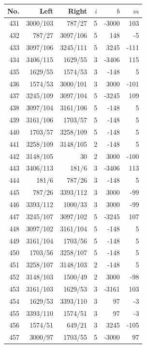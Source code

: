 \documentclass[11pt,a4paper]{article}
\begin{document}
\noindent\begin{minipage}[t]{.49\linewidth}\centering\footnotesize\setlength{\tabcolsep}{2pt}\renewcommand{\arraystretch}{1.09}
\begin{tabular*}{\linewidth}{@{}r@{\extracolsep{\fill}}rrrrr@{}}\toprule
No. & Left & Right & $i$ & $b$ & $m$\\\midrule
431 & 3000/103 & 787/27 & 5 & -3000 & 103\\
432 & 787/27 & 3097/106 & 5 & 148 & -5\\
433 & 3097/106 & 3245/111 & 5 & 3245 & -111\\
434 & 3406/115 & 1629/55 & 3 & -3406 & 115\\
435 & 1629/55 & 1574/53 & 3 & -148 & 5\\
436 & 1574/53 & 3000/101 & 3 & 3000 & -101\\
437 & 3245/109 & 3097/104 & 5 & -3245 & 109\\
438 & 3097/104 & 3161/106 & 5 & -148 & 5\\
439 & 3161/106 & 1703/57 & 5 & -148 & 5\\
440 & 1703/57 & 3258/109 & 5 & -148 & 5\\
441 & 3258/109 & 3148/105 & 2 & -148 & 5\\
442 & 3148/105 & 30 & 2 & 3000 & -100\\
443 & 3406/113 & 181/6 & 3 & -3406 & 113\\
444 & 181/6 & 787/26 & 3 & -148 & 5\\
445 & 787/26 & 3393/112 & 3 & 3000 & -99\\
446 & 3393/112 & 1000/33 & 3 & 3000 & -99\\
447 & 3245/107 & 3097/102 & 5 & -3245 & 107\\
448 & 3097/102 & 3161/104 & 5 & -148 & 5\\
449 & 3161/104 & 1703/56 & 5 & -148 & 5\\
450 & 1703/56 & 3258/107 & 5 & -148 & 5\\
451 & 3258/107 & 3148/103 & 2 & -148 & 5\\
452 & 3148/103 & 1500/49 & 2 & 3000 & -98\\
453 & 3161/103 & 1629/53 & 3 & -3161 & 103\\
454 & 1629/53 & 3393/110 & 3 & 97 & -3\\
455 & 3393/110 & 1574/51 & 3 & 97 & -3\\
456 & 1574/51 & 649/21 & 3 & 3245 & -105\\
457 & 3000/97 & 1703/55 & 5 & -3000 & 97\\

\end{tabular*}
\end{minipage}
\end{document}
